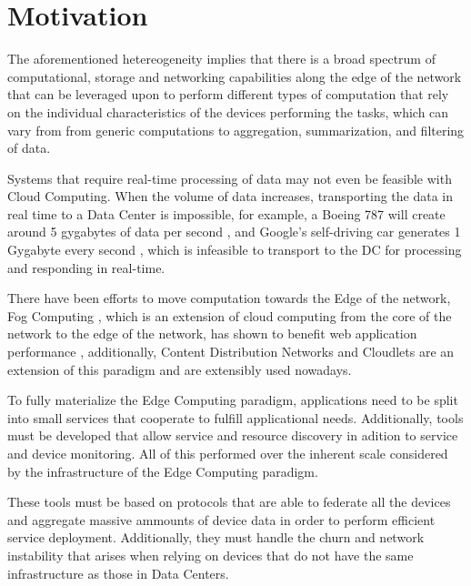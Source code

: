 \section{Motivation}

The aforementioned hetereogeneity implies that there is a broad spectrum of
computational, storage and networking capabilities along the edge of the network that
can be leveraged upon to perform different types of computation that rely on the individual
characteristics of the devices performing the tasks, which can vary from
from generic computations to aggregation, summarization, and filtering of data. \cite{DBLP:journals/corr/abs-1805-06989}

Systems that require real-time processing of data may not even be feasible with Cloud Computing. 
When the volume of data increases, transporting the data in real time to a Data Center is impossible, for example,
a  Boeing 787 will create around 5 gygabytes of data per second \cite{finnegan_2013}, and Google's self-driving
car generates 1 Gygabyte every second \cite{datafloq}, which is infeasible to transport to the DC for processing
and responding in real-time.


There have been efforts to move computation towards the Edge of the network, Fog Computing \cite{yi2015fog}, which is
an extension of cloud computing from the core of the network to the edge of the network, has shown to benefit
web application performance \cite{Improving_Web_Sites_Performance_Using_Edge_Servers_in_Fog_Computing_Architecture}, 
additionally, Content Distribution Networks \cite{} and Cloudlets \cite{} 
are an extension of this paradigm and are extensibly used nowadays.

To fully materialize the Edge Computing paradigm, applications need to be split into small services
that cooperate to fulfill applicational needs. Additionally, tools must be
developed that allow service and resource discovery in adition to service and device
monitoring. All of this performed over the inherent scale considered by the
infrastructure of the Edge Computing paradigm.


These tools must be based on protocols that are able to federate all the devices 
and aggregate massive ammounts of device data in order to perform efficient service deployment. 
Additionally, they must handle the churn and network instability that arises when relying on devices 
that do not have the same infrastructure as those in Data Centers.

